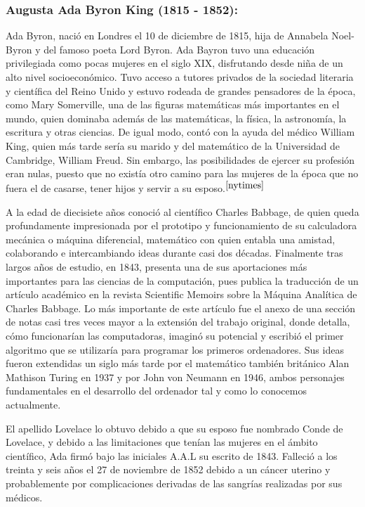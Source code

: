 \documentclass[runningheads,a4paper]{llncs}
\begin{document}
\subsubsection{Augusta Ada Byron King (1815 - 1852):} Ada Byron, nació en Londres el 10 de diciembre de 1815, hija de Annabela Noel-Byron y del famoso poeta Lord Byron. Ada Bayron tuvo una educación privilegiada como pocas mujeres en el siglo XIX, disfrutando desde niña de un alto nivel socioeconómico. Tuvo acceso a tutores privados de la sociedad literaria y científica del Reino Unido y estuvo rodeada de grandes pensadores de la época, como Mary Somerville, una de las figuras matemáticas más importantes en el mundo, quien dominaba además de las matemáticas, la física, la astronomía, la escritura y otras ciencias. De igual modo, contó con la ayuda del médico William King, quien más tarde sería su marido y del matemático de la Universidad de Cambridge, William Freud. Sin embargo, las posibilidades de ejercer su profesión eran nulas, puesto que no existía otro camino para las mujeres de la época que no fuera el de casarse, tener hijos y servir a su esposo.$^{\cite{nytimes}}$

A la edad de diecisiete años conoció al científico Charles Babbage, de quien queda profundamente impresionada por el prototipo y funcionamiento de su calculadora mecánica o máquina diferencial, matemático con quien entabla una amistad, colaborando e intercambiando ideas durante casi dos décadas. Finalmente tras largos años de estudio, en 1843, presenta una de sus aportaciones más importantes para las ciencias de la computación, pues publica la traducción de un artículo académico en la revista Scientific Memoirs sobre la Máquina Analítica de Charles Babbage. Lo más importante de este artículo fue el anexo de una sección de notas casi tres veces mayor a la extensión del trabajo original, donde detalla, cómo funcionarían las computadoras, imaginó su potencial y escribió el primer algoritmo que se utilizaría para programar los primeros ordenadores. Sus ideas fueron extendidas un siglo más tarde por el matemático también británico Alan Mathison Turing en 1937 y por John von Neumann en 1946, ambos personajes fundamentales en el desarrollo del ordenador tal y como lo conocemos actualmente.

El apellido Lovelace lo obtuvo debido a que su esposo fue nombrado Conde de Lovelace, y debido a las limitaciones que tenían las mujeres en el ámbito científico, Ada firmó bajo las iniciales A.A.L su escrito de 1843. Falleció a los treinta y seis años el 27 de noviembre de 1852 debido a un cáncer uterino y probablemente por complicaciones derivadas de las sangrías realizadas por sus médicos.
\end{document}
